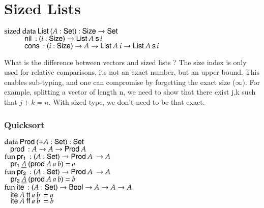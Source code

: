 \section{Sized Lists}
\begin{bsp}
$\mathrm{sized}\: \mathrm{data}\: \mathsf{List}\: ( A : \mathsf{Set} ) : \mathsf{Size} \rightarrow \mathsf{Set} $ \\
$\spcx \nil : \EPi{i}{\Size}{ \List A \: \s i} $\\
$\spcx \cons : \EPi{i}{\Size}{ A \ra \List A \: i \ra \List A \: \s i} $
\end{bsp}

What is the difference between vectors and sized lists ?
The size index is only used for relative comparisons, its not an exact number, but an upper bound.
This enables sub-typing, and one can compromise by forgetting the exact size ($\infty$).
For example, splitting a vector of length n, we need to show that there exist j,k such that $j+k = n$.
With sized type, we don't need to be that exact.

\subsubsection{Quicksort}
\begin{bsp}
$\mathrm{data}\: \mathsf{Prod}\: ( + A : \mathsf{Set}) : \mathsf{Set}$\\
$\hspace*{3mm}  \mathsf{prod}\: : A \rightarrow A \rightarrow \mathsf{Prod}\: A$\\

$\mathrm{fun}\: \mathsf{pr_1}\: : ( A : \mathsf{Set} ) \rightarrow \mathsf{Prod}\: A\: \rightarrow A$\\
$\hspace*{3mm} \mathsf{pr_1}\: \underline{A}\: (\mathsf{prod}\: A\: a \: b) = a$\\

$\mathrm{fun}\: \mathsf{pr_2}\: : ( A : \mathsf{Set} ) \rightarrow \mathsf{Prod}\: A\: \rightarrow A$\\
$\hspace*{3mm} \mathsf{pr_2}\: \underline{A}\: (\mathsf{prod}\: A\: a \: b) = b$\\

$\mathrm{fun}\: \mathsf{ite}\: : (A : \mathsf{Set} ) \rightarrow \mathsf{Bool} \rightarrow A \rightarrow A \rightarrow A$\\
$\hspace*{3mm} \mathsf{ite}\: A\: \mathsf{tt}\: a\: b\: = a$\\
$\hspace*{3mm} \mathsf{ite}\: A\: \mathsf{ff}\: a\: b\: = b$\\
\end{bsp}

